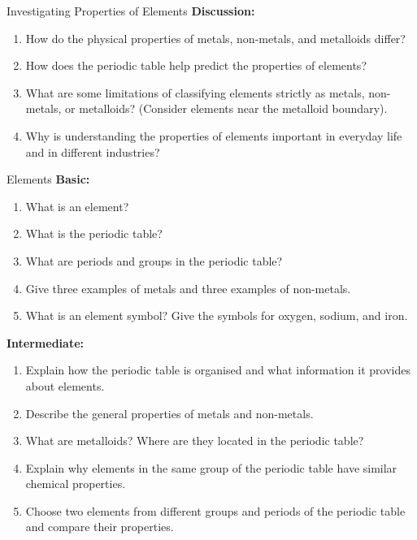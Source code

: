 \begin{investigation}{Investigating Properties of Elements}
\textbf{Discussion:}
\begin{enumerate}
    \item How do the physical properties of metals, non-metals, and metalloids differ?
    \item How does the periodic table help predict the properties of elements?
    \item What are some limitations of classifying elements strictly as metals, non-metals, or metalloids? (Consider elements near the metalloid boundary).
    \item  Why is understanding the properties of elements important in everyday life and in different industries?
\end{enumerate}
\end{investigation}


\begin{tieredquestions}{Elements}
\textbf{Basic:}
\begin{enumerate}
    \item What is an element?
    \item What is the periodic table?
    \item What are periods and groups in the periodic table?
    \item Give three examples of metals and three examples of non-metals.
    \item What is an element symbol? Give the symbols for oxygen, sodium, and iron.
\end{enumerate}

\textbf{Intermediate:}
\begin{enumerate}
    \item Explain how the periodic table is organised and what information it provides about elements.
    \item Describe the general properties of metals and non-metals.
    \item What are metalloids? Where are they located in the periodic table?
    \item Explain why elements in the same group of the periodic table have similar chemical properties.
    \item Choose two elements from different groups and periods of the periodic table and compare their properties.
\end{enumerate}


\end{tieredquestions}
